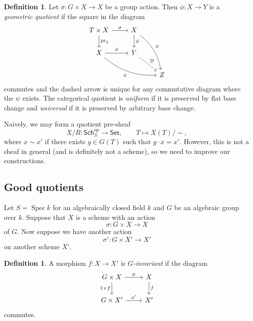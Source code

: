 \documentclass{amsart}
\theoremstyle{definition}
\newtheorem{defn}[thm]{Definition}
\theoremstyle{remark}
\theoremstyle{plain}
\theoremstyle{definition}
\theoremstyle{remark}
\newcommand{\mr}[1]{\mathrm{#1}}
\newcommand{\on}[1]{\operatorname{#1}}
\newcommand{\ms}[1]{\mathsf{#1}}
\newcommand{\1}{\mathbf{1}}
\newcommand{\2}{\mathbf{2}}
\newcommand{\3}{\mathbf{3}}
\DeclareMathOperator{\Spec}{Spec}
\begin{document}
\begin{defn}
    Let \(\sigma \colon G \times X \to X\) be a group action. Then \(\phi \colon X \to Y\) is a \textit{geometric quotient} if the square in the diagram
    \begin{equation*}
    \begin{tikzcd}
        T \times X \ar{r}{\sigma} \ar{d}{\on{pr}_2} & X \ar{d}{\phi} \ar[bend left=20]{ddr}{\psi} \\
        X \ar{r}{\phi} \ar[bend right=20, swap]{drr}{\psi} & Y \ar[dashed]{dr}{\exists !} \\
        & & Z
    \end{tikzcd}
    \end{equation*}
    commutes and the dashed arrow is unique for any commutative diagram where the \(\psi\) exists. The categorical quotient is \textit{uniform} if it is preserved by flat base change and \textit{universal} if it is preserved by arbitrary base change.
\end{defn}

Naively, we may form a quotient pre-sheaf
\[ X/R \colon \ms{Sch}_S^{\mr{op}} \to \ms{Set}, \qquad T \mapsto X(T) / \sim, \]
where \(x \sim x'\) if there exists \(g \in G(T)\) such that \(g \cdot x = x'\). However, this is not a sheaf in general (and is definitely not a scheme), so we need to improve our constructions.

\subsection{Good quotients}%
\label{sub:Good quotients}


Let \(S = \Spec k\) for an algebraically closed field \(k\) and \(G\) be an algebraic group over \(k\). Suppose that \(X\) is a scheme with an action
\[ \sigma \colon G \times X \to X \]
of \(G\). Now suppose we have another action
\[ \sigma' \colon G \times X' \to X' \]
on another scheme \(X'\).

\begin{defn}
    A morphism \(f \colon X \to X'\) is \textit{\(G\)-invariant} if the diagram
    \begin{equation*}
    \begin{tikzcd}
        G \times X \ar{r}{\sigma} \ar[swap]{d}{1 \times f} & X \ar{d}{f} \\
        G \times X' \ar{r}{\sigma'} & X'
    \end{tikzcd}
    \end{equation*}
    commutes.
\end{defn}
\end{document}
